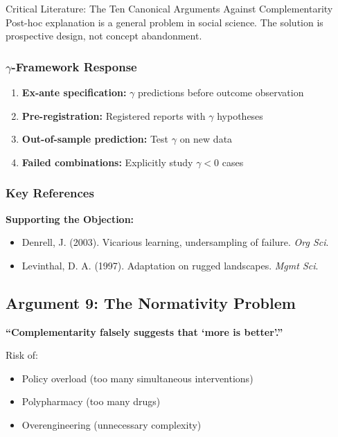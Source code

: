 \begin{chapter}{Critical Literature: The Ten Canonical Arguments Against Complementarity}
Post-hoc explanation is a general problem in social science. The solution is prospective design, not concept abandonment.

\subsubsection{$\gamma$-Framework Response}

\begin{enumerate}
    \item \textbf{Ex-ante specification:} $\gamma$ predictions before outcome observation
    \item \textbf{Pre-registration:} Registered reports with $\gamma$ hypotheses
    \item \textbf{Out-of-sample prediction:} Test $\gamma$ on new data
    \item \textbf{Failed combinations:} Explicitly study $\gamma < 0$ cases
\end{enumerate}

\subsubsection{Key References}

\textbf{Supporting the Objection:}
\begin{itemize}[noitemsep]
    \item Denrell, J. (2003). Vicarious learning, undersampling of failure. \textit{Org Sci}.
    \item Levinthal, D. A. (1997). Adaptation on rugged landscapes. \textit{Mgmt Sci}.
\end{itemize}

\subsection{Argument 9: The Normativity Problem}
\label{sec:arg-normativity}

\begin{tcolorbox}[colback=red!5!white,colframe=red!75!black,title=\textbf{Core Claim}]
\textbf{``Complementarity falsely suggests that `more is better'.''}

Risk of:
\begin{itemize}[noitemsep]
    \item Policy overload (too many simultaneous interventions)
    \item Polypharmacy (too many drugs)
    \item Overengineering (unnecessary complexity)
\end{itemize}
\end{tcolorbox}


\end{chapter}

